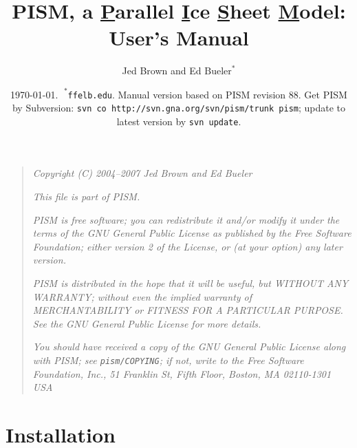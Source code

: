 \documentclass[11pt,final]{amsart}
\title[PISM User's Manual]{PISM, a \underline{P}arallel \underline{I}ce \underline{S}heet \underline{M}odel: \\ User's Manual}
\author{Jed Brown and Ed $\text{Bueler}^\ast$}
\date{\today.  $\phantom{|}^\ast$\texttt{ffelb\@@uaf.edu}.  Manual version based on PISM revision 88.  Get PISM by Subversion: \texttt{svn co http://svn.gna.org/svn/pism/trunk pism}; update to latest version by \texttt{svn update}.}
\newcommand{\normalspacing}{\renewcommand{\baselinestretch}{1.1}\tiny\normalsize}
\newcommand{\tablespacing}{\renewcommand{\baselinestretch}{1.0}\tiny\normalsize}
\begin{document}
\maketitle
\thispagestyle{empty}

\setcounter{tocdepth}{1}
\tableofcontents

\newpage
\phantom{bob}
\vspace{2in}
\begin{quote}
\textsl{Copyright (C) 2004--2007 Jed Brown and Ed Bueler}
\medskip

\noindent \textsl{This file is part of PISM.}
\medskip

\noindent \textsl{PISM is free software; you can redistribute it and/or modify it under the terms of the GNU General Public License as published by the Free Software Foundation; either version 2 of the License, or (at your option) any later version.}
\medskip

\noindent \textsl{PISM is distributed in the hope that it will be useful, but WITHOUT ANY WARRANTY; without even the implied warranty of MERCHANTABILITY or FITNESS FOR A PARTICULAR PURPOSE.  See the GNU General Public License for more details.}
\medskip

\noindent \textsl{You should have received a copy of the GNU General Public License along with PISM; see \emph{\texttt{pism/COPYING}}; if not, write to the Free Software Foundation, Inc., 51 Franklin St, Fifth Floor, Boston, MA  02110-1301 USA}
\end{quote}
\vspace{1in}
\normalspacing

\newpage
\section{Installation}
\end{document}
